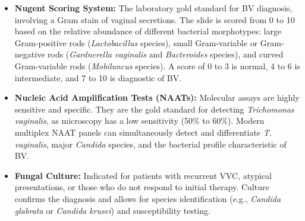 \begin{itemize}
    \begin{enumerate}
        \item Homogeneous, thin, gray-white discharge.
        \item Vaginal pH greater than 4.5.
        \item Positive amine whiff test.
        \item Clue cells representing greater than 20\% of vaginal epithelial cells on wet mount.
    \end{enumerate}
    \item \textbf{Nugent Scoring System:} The laboratory gold standard for BV diagnosis, involving a Gram stain of vaginal secretions. The slide is scored from 0 to 10 based on the relative abundance of different bacterial morphotypes: large Gram-positive rods (\textit{Lactobacillus} species), small Gram-variable or Gram-negative rods (\textit{Gardnerella vaginalis} and \textit{Bacteroides} species), and curved Gram-variable rods (\textit{Mobiluncus} species). A score of 0 to 3 is normal, 4 to 6 is intermediate, and 7 to 10 is diagnostic of BV.
    \item \textbf{Nucleic Acid Amplification Tests (NAATs):} Molecular assays are highly sensitive and specific. They are the gold standard for detecting \textit{Trichomonas vaginalis}, as microscopy has a low sensitivity (50\% to 60\%). Modern multiplex NAAT panels can simultaneously detect and differentiate \textit{T. vaginalis}, major \textit{Candida} species, and the bacterial profile characteristic of BV.
    \item \textbf{Fungal Culture:} Indicated for patients with recurrent VVC, atypical presentations, or those who do not respond to initial therapy. Culture confirms the diagnosis and allows for species identification (e.g., \textit{Candida glabrata} or \textit{Candida krusei}) and susceptibility testing.
\end{itemize}


